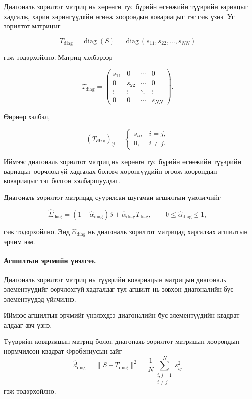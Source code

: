 Диагональ зорилтот матриц нь хөрөнгө тус бүрийн өгөөжийн
түүврийн вариацыг хадгалж, харин хөрөнгүүдийн өгөөж хоорондын
ковариацыг тэг гэж үзнэ. Уг зорилтот матрицыг

\[
T_{\mathrm{diag}}
=
\operatorname{diag}(S)
=
\operatorname{diag}
(s_{11},s_{22},\ldots,s_{NN})
\]

гэж тодорхойлно. Матриц хэлбэрээр

\[
T_{\mathrm{diag}}
=
\begin{pmatrix}
	s_{11} & 0      & \cdots & 0\\
	0      & s_{22} & \cdots & 0\\
	\vdots & \vdots & \ddots & \vdots\\
	0      & 0      & \cdots & s_{NN}
\end{pmatrix}.
\]

Өөрөөр хэлбэл,

\[
(T_{\mathrm{diag}})_{ij}
=
\begin{cases}
	s_{ii}, & i=j,\\
	0,      & i\neq j.
\end{cases}
\]

Иймээс диагональ зорилтот матриц нь хөрөнгө тус бүрийн
өгөөжийн түүврийн вариацыг өөрчлөхгүй хадгалах боловч
хөрөнгүүдийн өгөөж хоорондын ковариацыг тэг болгон
хялбаршуулдаг.

Диагональ зорилтот матрицад суурилсан шугаман агшилтын
үнэлэгчийг

\[
\widehat{\Sigma}_{\mathrm{diag}}
=
(1-\widehat{\alpha}_{\mathrm{diag}})S
+
\widehat{\alpha}_{\mathrm{diag}}T_{\mathrm{diag}},
\qquad
0\leq\widehat{\alpha}_{\mathrm{diag}}\leq1,
\]

гэж тодорхойлно. Энд
$\widehat{\alpha}_{\mathrm{diag}}$ нь диагональ зорилтот
матрицад харгалзах агшилтын эрчим юм.



\paragraph{Агшилтын эрчмийн үнэлгээ.}

Диагональ зорилтот матриц нь түүврийн ковариацын
матрицын диагональ элементүүдийг өөрчлөхгүй
хадгалдаг тул агшилт нь зөвхөн диагоналийн бус
элементүүдэд үйлчилнэ.

Иймээс агшилтын эрчмийг үнэлэхдээ
диагоналийн бус элементүүдийн квадрат
алдааг авч үзнэ.

Түүврийн ковариацын матриц болон
диагональ зорилтот матрицын хоорондын
нормчилсон квадрат Фробениусын зайг
\[
\widehat d_{\mathrm{diag}}
=
\|S-T_{\mathrm{diag}}\|^2
=
\frac{1}{N}
\sum_{\substack{i,j=1\\i\neq j}}^{N}
s_{ij}^{2}
\]
гэж тодорхойлно.

